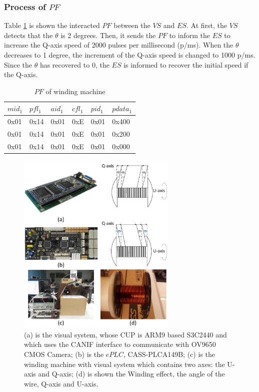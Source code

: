 \documentclass[journal,UTF8]{IEEEtran}
\begin{document}
\subsubsection{Process of $PF$}
Table \ref{table:PFofWinding} is shown the interacted $PF$ between the $VS$ and $ES$. At first, the $VS$ detects that the $\theta$ is 2 degrees. Then, it sends the $PF$ to inform the $ES$ to increase the Q-axis speed of 2000 pulses per millisecond (p/ms). When the $\theta$ decreases to 1 degree, the increment of the Q-axis speed is changed to 1000 p/ms. Since the $\theta$ has recovered to 0, the $ES$ is informed to recover the initial speed if the Q-axis.  
\begin{table}
	\scriptsize \caption{$PF$ of winding machine}
	\label{table:PFofWinding}
	\begin{center}
		\renewcommand{\arraystretch}{1.4}
		\setlength\tabcolsep{3pt}
		\begin{tabular}{|p{1.2cm}|p{1.2cm}|p{1.2cm}|p{1.2cm}|p{1.2cm}|p{1cm}|}
			\hline
			$mid_1$   & $pfl_1$ &$aid_1$ & $cfl_1$  & $pid_1$  &$pdata_1$   \\
			\hline
			0x01    & 0x14  &0x01  &0xE     &0x01   &0x400   \\
			\hline
			0x01    & 0x14  &0x01  &0xE     &0x01   &0x200   \\
			\hline
			0x01    & 0x14  &0x01  &0xE     &0x01   &0x000   \\
			\hline
		\end{tabular}
	\end{center}
\end{table}
\begin{figure}
	\centering
	\includegraphics[width=3in]{fig/Winding.pdf}
	\caption{ (a) is the visual system, whose CUP is ARM9 based S3C2440 and which uses the CANIF interface to communicate with OV9650 CMOS Camera; (b) is the $ePLC$, CASS-PLCA149B; (c) is the winding machine with visual system which contains two axes: the U-axis and Q-axis; (d) is shown the Winding effect, the angle of the wire, Q-axis and U-axis.}
	\label{fig:Winding}
\end{figure}
\end{document}
